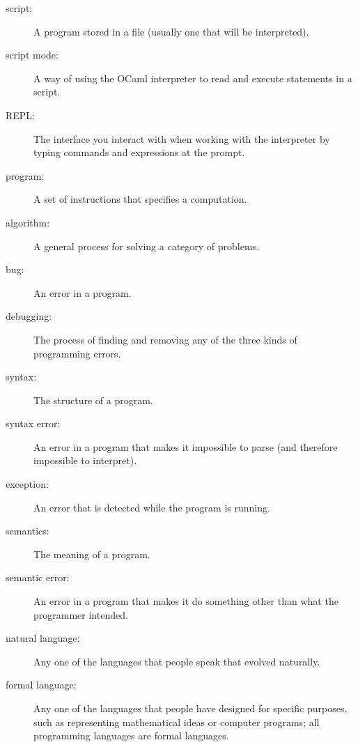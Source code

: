 \documentclass[10pt]{book}
\begin{document}
\begin{description}
\item[script:] A program stored in a file (usually one that will be interpreted).

\item[script mode:] A way of using the OCaml interpreter to read and execute statements in a script.

\item[REPL:] The interface you interact with when working with the interpreter by typing commands and expressions at the prompt.

\item[program:] A set of instructions that specifies a computation.

\item[algorithm:]  A general process for solving a category of problems.

\item[bug:]  An error in a program.

\item[debugging:]  The process of finding and removing any of the three kinds of programming errors.

\item[syntax:]  The structure of a program.

\item[syntax error:]  An error in a program that makes it impossible to parse (and therefore impossible to interpret).

\item[exception:]  An error that is detected while the program is running.

\item[semantics:]  The meaning of a program.

\item[semantic error:]   An error in a program that makes it do something other than what the programmer intended.

\item[natural language:]  Any one of the languages that people speak that evolved naturally.

\item[formal language:]  Any one of the languages that people have designed for specific purposes, such as representing mathematical ideas or computer programs; all programming languages are formal languages.


\end{description}
\end{document}
